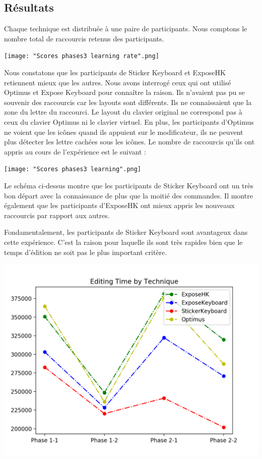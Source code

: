 \documentclass[12pt,a4paper]{article}
\begin{document}
\subsection{Résultats}
Chaque technique est distribuée à une paire de participants. Nous comptons le nombre total de raccourcis retenus des participants.
\begin{center}
	\texttt{[image: "Scores phases3 learning rate".png]}
\end{center}

Nous constatons que les participants de Sticker Keyboard et ExposeHK retiennent mieux que les autres. Nous avons interrogé ceux qui ont utilisé Optimus et Expose Keyboard pour connaître la raison. Ils n'avaient pas pu se souvenir des raccourcis car les layouts sont différents. Ils ne connaissaient que la zone du lettre du raccourci. Le layout du clavier original ne correspond pas à ceux du clavier Optimus ni le clavier virtuel. En plus, les participants d'Optimus ne voient que les icônes quand ils appuient sur le modificateur, ils ne peuvent plus détecter les lettre cachées sous les icônes. Le nombre de raccourcis qu'ils ont appris au cours de l'expérience est le suivant :
\begin{center}
	\texttt{[image: "Scores phases3 learning".png]}
\end{center}

Le schéma ci-dessus montre que les participants de Sticker Keyboard ont un très bon départ avec la connaissance de plus que la moitié des commandes. Il montre également que les participants d'ExposeHK ont mieux appris les nouveaux raccourcis par rapport aux autres.

Fondamentalement, les participants de Sticker Keyboard sont avantageux dans cette expérience. C'est la raison pour laquelle ils sont très rapides bien que le temps d'édition ne soit pas le plus important critère.
\begin{center}
	\includegraphics[width=1\linewidth]{TimeTechnique.png}
\end{center}
\end{document}

